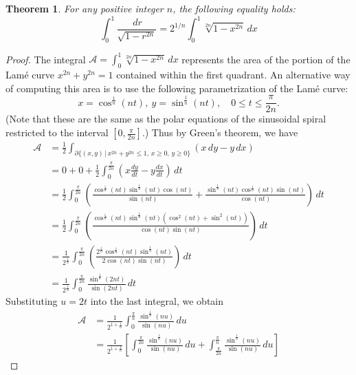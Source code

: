 \documentclass{amsart}
\newtheorem{theorem}{Theorem}
\theoremstyle{definition}
\newcommand{\calA}{\mathcal{A}}
\begin{document}
\begin{theorem}\label{fundamental_integral_theorem}
For any positive integer $n$, the following equality holds:
\begin{equation}\label{fundamental_identity}
    \int_0^1 \frac{\,dr}{\sqrt{1-r^{2n}}} = 2^{1/n} \int_0^1 \sqrt[2n]{1-x^{2n}} \, dx
\end{equation}
\end{theorem}


\begin{proof}
The integral $\calA=\int_0^1 \sqrt[2n]{1-x^{2n}} \, dx$ represents the area of the portion of
the Lam\'e curve $x^{2n}+y^{2n}=1$ contained within the first quadrant. An alternative way of
computing this area is to use the following parametrization of the Lam\'e curve:
\[x=\cos^{\frac{1}{n}}(nt),\ y=\sin^{\frac{1}{n}}(nt),\quad 0\le t\le\frac{\pi}{2n}.\]
(Note that these are the same as the polar equations of the sinusoidal spiral restricted to the interval $\left[0,\frac{\pi}{2n}\right]$.)
Thus by Green's theorem, we have
\begin{align*}
\calA &=\frac{1}{2}\int_{\partial\{(x,y)\,|\,x^{2n}+y^{2n}\le1,\,x\ge0,\,y\ge0\}}(x\,dy-y\,dx)\\
&=0+0+\frac{1}{2}\int_0^{\frac{\pi}{2n}}\left(x\frac{dy}{dt}-y\frac{dx}{dt}\right)\,dt\\
&=\frac{1}{2}\int_0^{\frac{\pi}{2n}}\left(\frac{\cos^{\frac{1}{n}}(nt)\sin^{\frac{1}{n}}(nt)\cos(nt)}{\sin(nt)}+
\frac{\sin^{\frac{1}{n}}(nt)\cos^{\frac{1}{n}}(nt)\sin(nt)}{\cos(nt)}\right)\,dt\\
&=\frac{1}{2}\int_0^{\frac{\pi}{2n}}\left(\frac{\cos^{\frac{1}{n}}(nt)\sin^{\frac{1}{n}}(nt)\left(\cos^2(nt)+\sin^2(nt)\right)}{\cos(nt)\sin(nt)}\right)\,dt\\
&=\frac{1}{2^{\frac{1}{n}}}\int_0^{\frac{\pi}{2n}}\left(\frac{2^{\frac{1}{n}}\cos^{\frac{1}{n}}(nt)\sin^{\frac{1}{n}}(nt)}{2\cos(nt)\sin(nt)}\right)\,dt\\
&=\frac{1}{2^{\frac{1}{n}}}\int_0^{\frac{\pi}{2n}}\frac{\sin^{\frac{1}{n}}(2nt)}{\sin(2nt)}\,dt
\end{align*}
Substituting $u=2t$ into the last integral, we obtain
\begin{align}
\calA&=\frac{1}{2^{1+\frac{1}{n}}}\int_0^{\frac{\pi}{n}}\frac{\sin^{\frac{1}{n}}(nu)}{\sin(nu)}\,du\nonumber\\
&=
\frac{1}{2^{1+\frac{1}{n}}}\left[\int_0^{\frac{\pi}{2n}}\frac{\sin^{\frac{1}{n}}(nu)}{\sin(nu)}\,du+\int_{\frac{\pi}{2n}}^{\frac{\pi}{n}}\frac{\sin^{\frac{1}{n}}(nu)}{\sin(nu)}\,du\right]\label{area_eqn2}

\end{align}
\end{proof}
\end{document}
